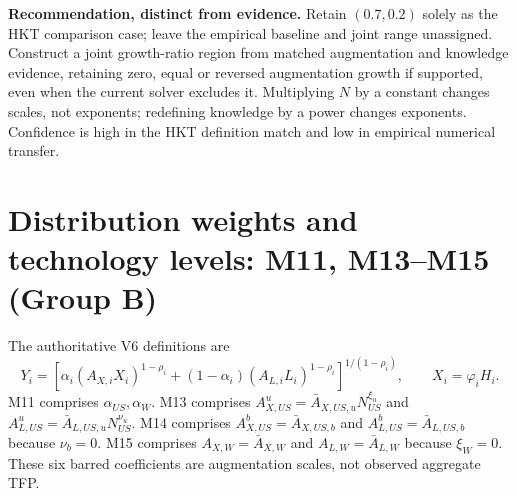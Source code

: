 \documentclass[10pt,a4paper,landscape]{article}
\begin{document}
\noindent\textbf{Recommendation, distinct from evidence.}
Retain $(0.7,0.2)$ solely as the HKT comparison case; leave the empirical
baseline and joint range unassigned. Construct a joint growth-ratio region
from matched augmentation and knowledge evidence, retaining zero, equal or
reversed augmentation growth if supported, even when the current solver
excludes it. Multiplying $N$ by a constant changes scales, not exponents;
redefining knowledge by a power changes exponents. Confidence is high in
the HKT definition match and low in empirical numerical transfer.


\clearpage
\section[Distribution weights and technology levels: M11, M13--M15 (Group B)]{Distribution weights and technology levels: M11, M13--M15 (Group B)}

The authoritative V6 definitions are
\[
Y_i=\left[\alpha_i(A_{X,i}X_i)^{1-\rho_i}
 +(1-\alpha_i)(A_{L,i}L_i)^{1-\rho_i}\right]^{1/(1-\rho_i)},
\qquad X_i=\varphi_iH_i .
\]
M11 comprises $\alpha_{US},\alpha_W$. M13 comprises
$A^u_{X,US}=\bar A_{X,US,u}N_{US}^{\xi_u}$ and
$A^u_{L,US}=\bar A_{L,US,u}N_{US}^{\nu_u}$.
M14 comprises $A^b_{X,US}=\bar A_{X,US,b}$ and
$A^b_{L,US}=\bar A_{L,US,b}$ because $\nu_b=0$.
M15 comprises $A_{X,W}=\bar A_{X,W}$ and $A_{L,W}=\bar A_{L,W}$ because $\xi_W=0$.
These six barred coefficients are augmentation scales, not observed aggregate TFP.
\end{document}
